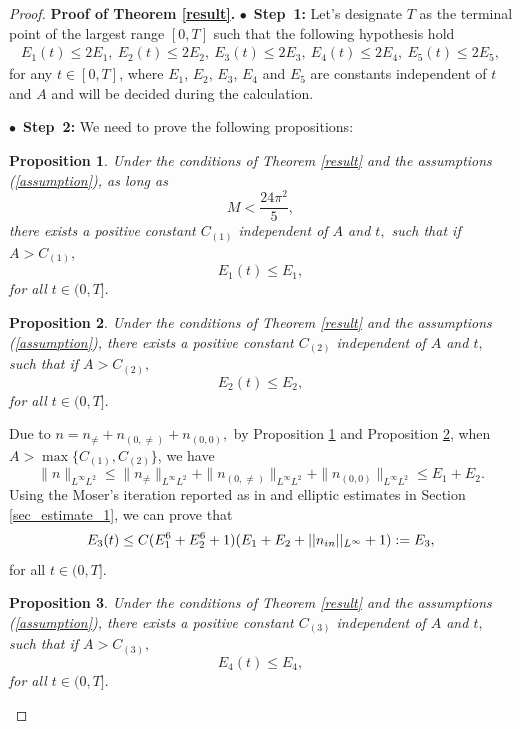 \documentclass[12pt, reqno]{amsart}
\newtheorem{proposition}{Proposition}[section]
\numberwithin{equation}{section}
\begin{document}
	\begin{proof}
	  
	
	{\bf Proof of Theorem \ref{result}.}
	$\bullet$~\textbf{Step~1:} Let's designate $T$ as the terminal point of the largest range $[0, T]$ such that the following
	hypothesis hold
	\begin{equation} \label{assumption}	
		\begin{aligned}
			E_1(t)\leq 2E_1, \
			E_2(t)\leq 2E_2, \
			E_3(t)\leq 2E_3, \
			E_4(t)\leq 2E_4, \
			E_5(t)\leq 2E_5,
		\end{aligned}
	\end{equation}
	for any $t\in[0, T]$, where $E_1$, $E_2$, $E_3$, $E_4$ and $E_5$ are constants independent of
	$t$ and $A$ and
	will be decided during the calculation.
	
	$\bullet$~\textbf{Step~2:} 
	We need to prove the following propositions:
	\begin{proposition}{}\label{pro0}
		Under the conditions of  Theorem \ref{result} and  the assumptions (\ref{assumption}),
		as long as $$M< \frac{24\pi^2}{5},$$
		there exists a positive constant $C_{(1)}$ independent of $A$ and $t,$
		such that if $A>C_{(1)},$
		$$E_1(t)\leq E_1,$$
		for all $t\in(0,T].$
	\end{proposition}
	\begin{proposition}{}\label{pro1}
		Under the conditions of Theorem \ref{result} and  the assumptions (\ref{assumption}),
		there exists a positive constant $C_{(2)}$ independent of $A$ and $t,$
		such that if $A>C_{(2)},$
		$$E_2(t)\leq E_2,$$
		for all $t\in(0,T].$
	\end{proposition}
	
	Due to $n=n_{\neq}+n_{(0,\neq)}+n_{(0,0)},$ 
	by Proposition \ref{pro0} and Proposition \ref{pro1}, 
	when $A>\max\{C_{(1)},C_{(2)}\}$,
	we have $$\|n\|_{L^{\infty}L^2}\leq 
	\|n_{\neq}\|_{L^{\infty}L^2}
	+\|n_{(0,\neq)}\|_{L^{\infty}L^2}+\|n_{(0,0)}\|_{L^{\infty}L^2}\leq E_1+E_2.$$
	Using the Moser's iteration reported as in \cite{CWW1} and elliptic
	estimates in Section \ref{sec_estimate_1},  we can prove that $$E_3(t)\leq C(E_{1}^{6}+E_{2}^{6}+1)(E_1+E_2+||n_{\rm in}||_{L^\infty}+1):=E_3,$$  
	for all $t\in(0,T].$
	\begin{proposition}{}\label{pro3}
		Under the conditions of Theorem \ref{result} and  the assumptions (\ref{assumption}),
		there exists a positive constant $C_{(3)}$ independent of $A$ and $t,$
		such that if $A>C_{(3)},$
		$$E_4(t)\leq E_4,$$
		for all $t\in(0,T].$
	\end{proposition}
	

\end{proof}
\end{document}
